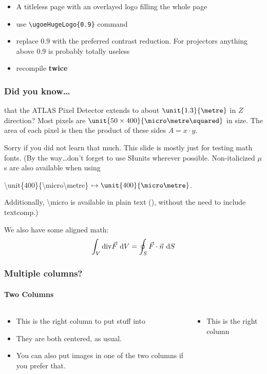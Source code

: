 \documentclass[10pt]{beamer}
\begin{document}
\begin{frame}
  \begin{itemize}
    \item 
      A titleless page with an overlayed logo filling the whole page
    \item
      use \texttt{\textbackslash ugoeHugeLogo\{0.9\}} command
    \item
      replace 0.9 with the preferred contrast reduction. For projectors
      anything above 0.9 is probably totally useless
    \item
      recompile \textbf{twice}
  \end{itemize}
\end{frame}

\begin{frame}
  \frametitle{Did you know\ldots}
  that the ATLAS Pixel Detector extends to about $\unit{1.3}{\metre}$ in $Z$ 
  direction?  Most pixels are $\unit{50\times 400}{\micro\metre\squared}$ in 
  size.
  The area of each pixel is then the product of these sides $A = x \cdot y$.

  Sorry if you did not learn that much. This slide is mostly just for testing 
  math fonts. (By the way\ldots don't forget to use SIunits wherever possible.
  Non-italicized $\mu$s are also available when using
  \begin{center}
    \textbackslash{}unit\{400\}\{\textbackslash{}micro\textbackslash{}metre\}
    $\mapsto \unit{400}{\micro\metre}$.
  \end{center}
  Additionally, \textbackslash{}micro is available in plain text (\micro), without
  the need to include textcomp.) 

  We also have some aligned math:
  \begin{align*}
    \int_{V} {\rm div}\vec F ~{\rm d}V = \oint_{S} \vec F \cdot \vec n ~\text dS
  \end{align*}
\end{frame}

\begin{frame}
  \frametitle{Multiple columns?}
  \framesubtitle{Two Columns}
  \begin{columns}
    \begin{column}{0.5\textwidth}
      \begin{itemize}
        \item 
          This is the right column to put stuff into
        \item
          They are both centered, as usual.
        \item
          You can also put images in one of the two columns if you prefer
          that.
      \end{itemize}
    \end{column}
    \begin{column}{0.5\textwidth}
      \begin{itemize}
        \item 
          This is the right column
      \end{itemize}
    \end{column}
  \end{columns}
\end{frame}
\end{document}
